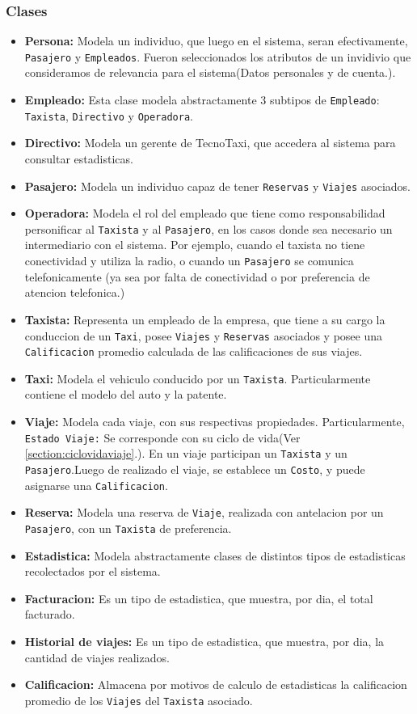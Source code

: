 \subsubsection{Clases}
\begin{itemize}
	\item \textbf{Persona:} Modela un individuo, que luego en el sistema, seran efectivamente, \texttt{Pasajero} y \texttt{Empleados}. Fueron seleccionados los atributos de un invidivio que consideramos de relevancia para el sistema(Datos personales y de cuenta.).
	\item \textbf{Empleado:} Esta clase modela abstractamente 3 subtipos de \texttt{Empleado}: \texttt{Taxista}, \texttt{Directivo} y \texttt{Operadora}.
	\item \textbf{Directivo:} Modela un gerente de TecnoTaxi, que accedera al sistema para consultar estadisticas.
	\item \textbf{Pasajero:} Modela un individuo capaz de tener \texttt{Reservas} y \texttt{Viajes} asociados.
	\item \textbf{Operadora:} Modela el rol del empleado que tiene como responsabilidad personificar al \texttt{Taxista} y al \texttt{Pasajero}, en los casos donde sea necesario un intermediario con el sistema. Por ejemplo, cuando el taxista no tiene conectividad y utiliza la radio, o cuando un \texttt{Pasajero} se comunica telefonicamente (ya sea por falta de conectividad o por preferencia de atencion telefonica.)
	\item \textbf{Taxista:} Representa un empleado de la empresa, que tiene a su cargo la conduccion de un \texttt{Taxi}, posee \texttt{Viajes} y \texttt{Reservas} asociados y posee una \texttt{Calificacion} promedio calculada de las calificaciones de sus viajes.
	\item \textbf{Taxi:} Modela el vehiculo conducido por un \texttt{Taxista}. Particularmente contiene el modelo del auto y la patente.
	\item \textbf{Viaje:} Modela cada viaje, con sus respectivas propiedades. Particularmente, \texttt{Estado Viaje:} Se corresponde con su ciclo de vida(Ver \ref{section:ciclovidaviaje}.).
	En un viaje participan un \texttt{Taxista} y un \texttt{Pasajero}.Luego de realizado el viaje, se establece un \texttt{Costo}, y puede asignarse una \texttt{Calificacion}.
	\item \textbf{Reserva:} Modela una reserva de \texttt{Viaje}, realizada con antelacion por un \texttt{Pasajero}, con un \texttt{Taxista} de preferencia.
	\item \textbf{Estadistica:} Modela abstractamente clases de distintos tipos de estadisticas recolectados por el sistema.
	\item \textbf{Facturacion:} Es un tipo de estadistica, que muestra, por dia, el total facturado.
	\item \textbf{Historial de viajes:} Es un tipo de estadistica, que muestra, por dia, la cantidad de viajes realizados.
	\item \textbf{Calificacion:} Almacena por motivos de calculo de estadisticas la calificacion promedio de los \texttt{Viajes} del \texttt{Taxista} asociado.
\end{itemize}

